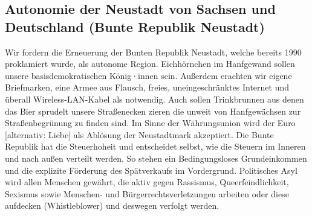 \documentclass[a4paper, 11pt]{article}
\begin{document}
%
%
%



\subsection{Autonomie der Neustadt von Sachsen und Deutschland (Bunte Republik Neustadt)}

Wir fordern die Erneuerung der Bunten Republik Neustadt, welche bereits 1990 proklamiert wurde, als autonome Region. Eichhörnchen im Hanfgewand sollen unsere basisdemokratischen König·innen sein. Außerdem erachten wir eigene Briefmarken, eine Armee aus Flausch, freies, uneingeschränktes Internet und überall Wireless-LAN-Kabel als notwendig. Auch sollen Trinkbrunnen aus denen das Bier sprudelt unsere Straßenecken zieren die unweit von Hanfgewächsen zur Straßenbegrünung zu finden sind. Im Sinne der Währungsunion wird der Euro [alternativ: Liebe] als Ablösung der Neustadtmark akzeptiert. Die Bunte Republik hat die Steuerhoheit und entscheidet selbst, wie die Steuern im Inneren und nach außen verteilt werden. So stehen ein Bedingungsloses Grundeinkommen und die explizite Förderung des Spätverkaufs im Vordergrund. Politisches Asyl wird allen Menschen gewährt, die aktiv gegen Rassismus, Queerfeindlichkeit, Sexismus sowie Menschen- und Bürgerrechtsverletzungen arbeiten oder diese aufdecken (Whistleblower) und deswegen verfolgt werden.
\end{document}
